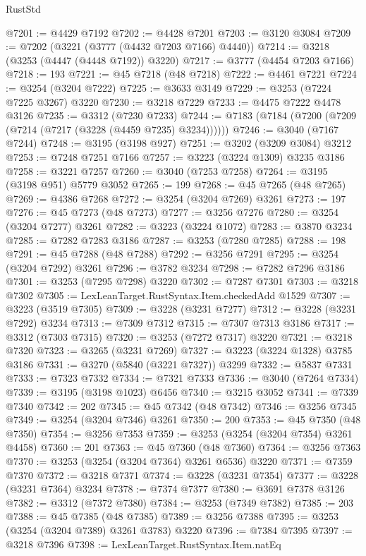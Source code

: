 \begin{lexlean}{RustStd}
\begin{coremodule}
{\begin{coremodule}
{{{{{{{{{{{{{{{{{{{{{{{{{{{{{{{{{{{{{@7201 := @4429 @7192
@7202 := @4428 @7201
@7203 := @3120 @3084
@7209 := @7202 (@3221 (@3777 (@4432 @7203 @7166) @4440))
@7214 := @3218 (@3253 (@4447 (@4448 @7192)) @3220)
@7217 := @3777 (@4454 @7203 @7166)
@7218 := 193
@7221 := @45 @7218 (@48 @7218)
@7222 := @4461 @7221
@7224 := @3254 (@3204 @7222)
@7225 := @3633 @3149
@7229 := @3253 (@7224 @7225 @3267) @3220
@7230 := @3218 @7229
@7233 := @4475 @7222 @4478 @3126
@7235 := @3312 (@7230 @7233)
@7244 := @7183 (@7184 (@7200 (@7209 (@7214 (@7217 (@3228 (@4459 @7235) @3234))))))
@7246 := @3040 (@7167 @7244)
@7248 := @3195 (@3198 @927)
@7251 := @3202 (@3209 @3084) @3212
@7253 := @7248 @7251 @7166
@7257 := @3223 (@3224 @1309) @3235 @3186
@7258 := @3221 @7257
@7260 := @3040 (@7253 @7258)
@7264 := @3195 (@3198 @951) @5779 @3052
@7265 := 199
@7268 := @45 @7265 (@48 @7265)
@7269 := @4386 @7268
@7272 := @3254 (@3204 @7269) @3261
@7273 := 197
@7276 := @45 @7273 (@48 @7273)
@7277 := @3256 @7276
@7280 := @3254 (@3204 @7277) @3261
@7282 := @3223 (@3224 @1072)
@7283 := @3870 @3234
@7285 := @7282 @7283 @3186
@7287 := @3253 (@7280 @7285)
@7288 := 198
@7291 := @45 @7288 (@48 @7288)
@7292 := @3256 @7291
@7295 := @3254 (@3204 @7292) @3261
@7296 := @3782 @3234
@7298 := @7282 @7296 @3186
@7301 := @3253 (@7295 @7298) @3220
@7302 := @7287 @7301
@7303 := @3218 @7302
@7305 := LexLeanTarget.RustSyntax.Item.checkedAdd @1529
@7307 := @3223 (@3519 @7305)
@7309 := @3228 (@3231 @7277)
@7312 := @3228 (@3231 @7292) @3234
@7313 := @7309 @7312
@7315 := @7307 @7313 @3186
@7317 := @3312 (@7303 @7315)
@7320 := @3253 (@7272 @7317) @3220
@7321 := @3218 @7320
@7323 := @3265 (@3231 @7269)
@7327 := @3223 (@3224 @1328) @3785 @3186
@7331 := @3270 (@5840 (@3221 @7327)) @3299
@7332 := @5837 @7331
@7333 := @7323 @7332
@7334 := @7321 @7333
@7336 := @3040 (@7264 @7334)
@7339 := @3195 (@3198 @1023) @6456
@7340 := @3215 @3052
@7341 := @7339 @7340
@7342 := 202
@7345 := @45 @7342 (@48 @7342)
@7346 := @3256 @7345
@7349 := @3254 (@3204 @7346) @3261
@7350 := 200
@7353 := @45 @7350 (@48 @7350)
@7354 := @3256 @7353
@7359 := @3253 (@3254 (@3204 @7354) @3261 @4458)
@7360 := 201
@7363 := @45 @7360 (@48 @7360)
@7364 := @3256 @7363
@7370 := @3253 (@3254 (@3204 @7364) @3261 @6536) @3220
@7371 := @7359 @7370
@7372 := @3218 @7371
@7374 := @3228 (@3231 @7354)
@7377 := @3228 (@3231 @7364) @3234
@7378 := @7374 @7377
@7380 := @3691 @7378 @3126
@7382 := @3312 (@7372 @7380)
@7384 := @3253 (@7349 @7382)
@7385 := 203
@7388 := @45 @7385 (@48 @7385)
@7389 := @3256 @7388
@7395 := @3253 (@3254 (@3204 @7389) @3261 @3783) @3220
@7396 := @7384 @7395
@7397 := @3218 @7396
@7398 := LexLeanTarget.RustSyntax.Item.natEq
}}}}}}}}}}}}}}}}}}}}}}}}}}}}}}}}}}}}}
\end{coremodule}}
\end{coremodule}
\end{lexlean}
